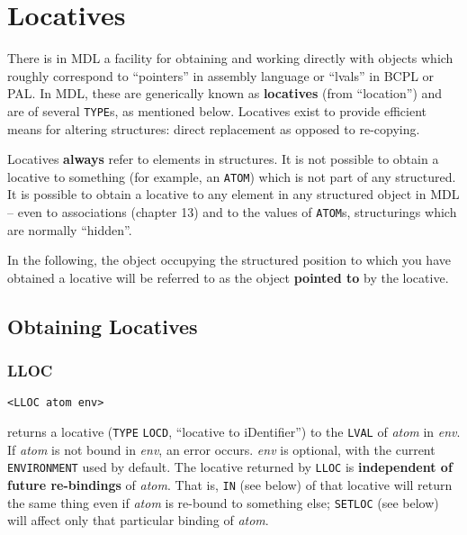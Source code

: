\documentclass[a4paper]{scrbook}
\begin{document}
\chapter{Locatives}\label{chapter-12.-locatives}

There is in MDL a facility for obtaining and working directly with objects which roughly correspond to ``pointers'' in
assembly language or ``lvals'' in BCPL or PAL. In MDL, these are generically known as \textbf{locatives} (from
``location'') and are of several \texttt{TYPE}s, as mentioned below. Locatives exist to provide efficient means for
altering structures: direct replacement as opposed to re-copying.

Locatives \textbf{always} refer to elements in structures. It is not possible to obtain a locative to something (for
example, an \texttt{ATOM}) which is not part of any structured. It is possible to obtain a locative to any element in any
structured object in MDL -- even to associations (chapter 13) and to the values of \texttt{ATOM}s, structurings which are
normally ``hidden''.

In the following, the object occupying the structured position to which you have obtained a locative will be referred to as
the object \textbf{pointed to} by the locative.

\section{Obtaining Locatives}\label{obtaining-locatives}

\subsection{LLOC}\label{lloc}

\begin{verbatim}
<LLOC atom env>
\end{verbatim}

 returns a locative (\texttt{TYPE} \texttt{LOCD}, ``locative to
iDentifier'') to the \texttt{LVAL}  of \emph{atom} in \emph{env}. If \emph{atom} is not bound in
\emph{env}, an error occurs. \emph{env} is optional, with the current \texttt{ENVIRONMENT} used by default. The locative
returned by \texttt{LLOC} is \textbf{independent of future re-bindings} of \emph{atom}. That is, \texttt{IN}
 (see below) of that locative will return the same thing even if \emph{atom} is re-bound to something
else; \texttt{SETLOC}  (see below) will affect only that particular binding of \emph{atom}.
\end{document}
